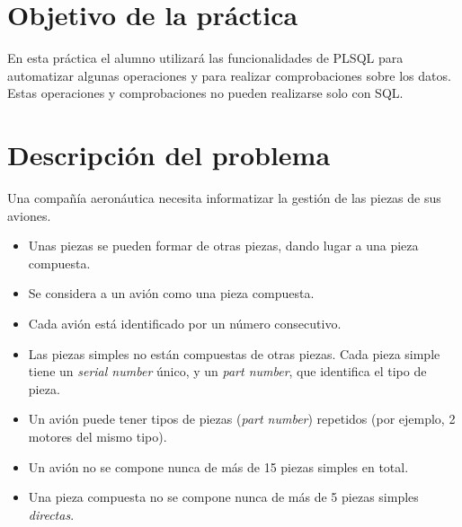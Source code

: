 
\usepackage{eurosym}
\usepackage{needspace}




\renewcommand{\hmwkTitle}{Práctica PLSQL}
\renewcommand{\hmwkClass}{Bases de datos}

\usepackage{blindtext}






\primerapagina

\setlength{\parindent}{1em}
\setlength{\parskip}{1em}

\section{Objetivo de la práctica}
En esta práctica el alumno utilizará las funcionalidades de PLSQL para automatizar algunas operaciones y para realizar comprobaciones sobre los datos. Estas operaciones y comprobaciones no pueden realizarse solo con SQL.


\newcommand{\maximopiezasavion}{15}
\newcommand{\maximopiezaspieza}{5}


\section{Descripción del problema}
Una compañía aeronáutica necesita informatizar la gestión de las piezas de sus aviones.
\begin{itemize}
\item Unas piezas se pueden formar de otras piezas, dando lugar a una pieza compuesta.
\item Se considera a un avión como una pieza compuesta.
\item Cada avión está identificado por un número consecutivo.
\item Las piezas simples no están compuestas de otras piezas. Cada pieza simple tiene un \textit{serial number} único, y un \textit{part number}, que identifica el tipo de pieza.
\item Un avión puede tener tipos de piezas (\textit{part number}) repetidos (por ejemplo, 2 motores del mismo tipo).
\item Un avión no se compone nunca de más de {\maximopiezasavion} piezas simples en total.
\item Una pieza compuesta no se compone nunca de más de {\maximopiezaspieza} piezas simples \textit{directas}.
\end{itemize}

